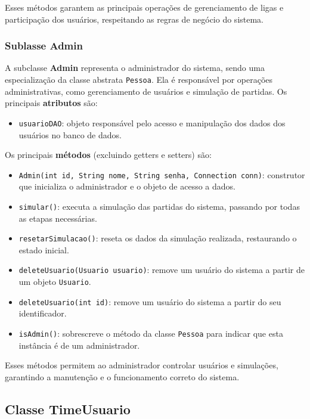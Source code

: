 \documentclass[12pt]{article}
\begin{document}
Esses métodos garantem as principais operações de gerenciamento de ligas e participação dos usuários, respeitando as regras de negócio do sistema.

\subsubsection{Sublasse Admin}

A subclasse \textbf{Admin} representa o administrador do sistema, sendo uma especialização da classe abstrata \texttt{Pessoa}. Ela é responsável por operações administrativas, como gerenciamento de usuários e simulação de partidas. Os principais \textbf{atributos} são:

\begin{itemize}
  \item \texttt{usuarioDAO}: objeto responsável pelo acesso e manipulação dos dados dos usuários no banco de dados.
\end{itemize}

Os principais \textbf{métodos} (excluindo getters e setters) são:

\begin{itemize}
  \item \texttt{Admin(int id, String nome, String senha, Connection conn)}: construtor que inicializa o administrador e o objeto de acesso a dados.
  \item \texttt{simular()}: executa a simulação das partidas do sistema, passando por todas as etapas necessárias.
  \item \texttt{resetarSimulacao()}: reseta os dados da simulação realizada, restaurando o estado inicial.
  \item \texttt{deleteUsuario(Usuario usuario)}: remove um usuário do sistema a partir de um objeto \texttt{Usuario}.
  \item \texttt{deleteUsuario(int id)}: remove um usuário do sistema a partir do seu identificador.
  \item \texttt{isAdmin()}: sobrescreve o método da classe \texttt{Pessoa} para indicar que esta instância é de um administrador.
\end{itemize}

Esses métodos permitem ao administrador controlar usuários e simulações, garantindo a manutenção e o funcionamento correto do sistema.

\subsection{Classe TimeUsuario}
\end{document}
